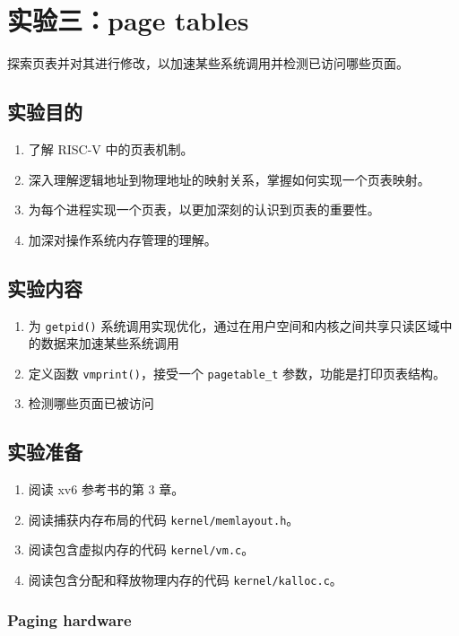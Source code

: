 \section{实验三：page tables}\label{sec:page tables}

探索页表并对其进行修改，以加速某些系统调用并检测已访问哪些页面。

\subsection{实验目的}

\begin{enumerate}
	\item 了解 RISC-V 中的页表机制。
	\item 深入理解逻辑地址到物理地址的映射关系，掌握如何实现一个页表映射。
	\item 为每个进程实现一个页表，以更加深刻的认识到页表的重要性。
	\item 加深对操作系统内存管理的理解。
\end{enumerate}

\subsection{实验内容}

\begin{enumerate}
	\item 为 \texttt{getpid()} 系统调用实现优化，通过在用户空间和内核之间共享只读区域中的数据来加速某些系统调用
	\item 定义函数 \texttt{vmprint()}，接受一个 \texttt{pagetable\_t} 参数，功能是打印页表结构。
	\item 检测哪些页面已被访问
\end{enumerate}

\subsection{实验准备}

\begin{enumerate}
	\item 阅读 xv6 参考书的第 3 章。
	\item 阅读捕获内存布局的代码 \texttt{kernel/memlayout.h}。
	\item 阅读包含虚拟内存的代码 \texttt{kernel/vm.c}。
	\item 阅读包含分配和释放物理内存的代码 \texttt{kernel/kalloc.c}。
\end{enumerate}

\subsubsection{Paging hardware}

